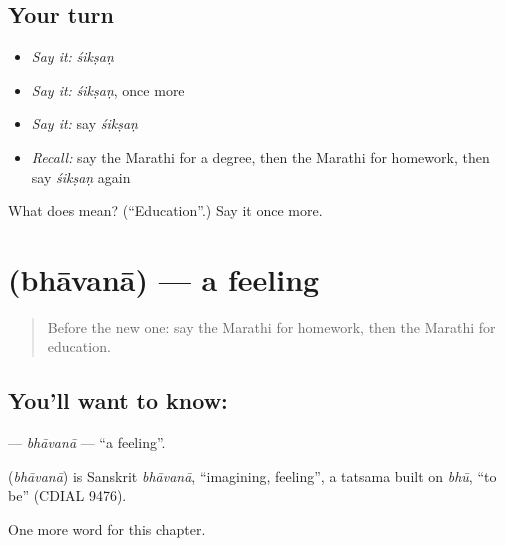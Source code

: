 \subsection*{Your turn}
\begin{itemize}
\raggedright
  \item \emph{Say it:} \emph{śikṣaṇ}
  \item \emph{Say it:} \emph{śikṣaṇ}, once more
  \item \emph{Say it:} say \emph{śikṣaṇ}
  \item \emph{Recall:} say the Marathi for a degree, then the Marathi for homework, then say \emph{śikṣaṇ} again
\end{itemize}

\begin{tcolorbox}[breakable,colback=teal!4,colframe=teal!35!black,title={Before you move on}]
What does  mean? (\textquotedblleft{}Education\textquotedblright{}.) Say it once more.
\end{tcolorbox}
\section[\texorpdfstring{\mr{भावना} (bhāvanā)}{भावना (bhāvanā)}]{ (bhāvanā) — a feeling}

\label{lesson:MR-C247-bhavana}



\begin{quote}
Before the new one: say the Marathi for homework, then the Marathi for education.
\end{quote}

\subsection*{You'll want to know: }
\textbf{} — \emph{bhāvanā} — \textquotedblleft{}a feeling\textquotedblright{}.

\begin{cousinweb}
\textbf{} (\emph{bhāvanā}) is Sanskrit \emph{bhāvanā}, \textquotedblleft{}imagining, feeling\textquotedblright{}, a tatsama built on \emph{bhū}, \textquotedblleft{}to be\textquotedblright{} (CDIAL 9476).
\end{cousinweb}

\begin{grammarlens}[title={What you've built}]
One more word for this chapter.
\end{grammarlens}

